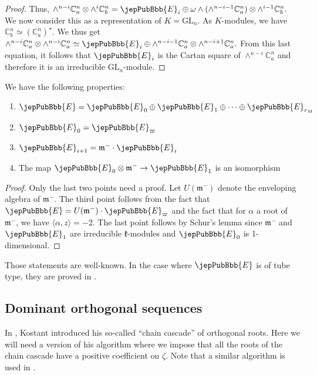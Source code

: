 \begin{proof}
Thus, $\wedge^{n-i}\mathbb C_a^n\otimes\wedge^i\mathbb C_b^n=\jepPubBbb{E}_i\oplus\omega\wedge(\wedge^{n-i-1}\mathbb C_a^n)\otimes\wedge^{i-1}\mathbb C_b^n.$ We now consider this as a representation of $K=\mathrm{GL}_n$. As $K$-modules, we have $\mathbb C_b^n\simeq(\mathbb C_a^n)^\star$. We thus get $\wedge^{n-i}\mathbb C_a^n\otimes\wedge^{n-i}\mathbb C_a^n\simeq\jepPubBbb{E}_i\oplus\wedge^{n-i-1}\mathbb C_a^n\otimes\wedge^{n-i+1}\mathbb C_a^n.$ From this last equation, it follows that $\jepPubBbb{E}_i$ is the Cartan square of $\wedge^{n-i}\mathbb C_a^n$ and therefore it is an irreducible $\mathrm{GL}_n$-module.
\end{proof}
\begin{proposition}
We have the following properties:
\begin{enumerate}[label=(\alph*)]
\item $\jepPubBbb{E}=\jepPubBbb{E}_0\oplus\jepPubBbb{E}_1\oplus\cdots\oplus\jepPubBbb{E}_{r_M}$
\item $\jepPubBbb{E}_0=\jepPubBbb{E}_\varpi$
\item $\jepPubBbb{E}_{i+1}=\mathfrak m^-\cdot\jepPubBbb{E}_i$
\item The map $\jepPubBbb{E}_0\otimes\mathfrak m^-\to\jepPubBbb{E}_1$ is an isomorphism
\end{enumerate}
\end{proposition}
\begin{proof}
Only the last two points need a proof. Let $U(\mathfrak m^-)$ denote the enveloping algebra of $\mathfrak m^-$. The third point follows from the fact that $\jepPubBbb{E}=U(\mathfrak m^-)\cdot\jepPubBbb{E}_\varpi$ and the fact that for $\alpha$ a root of $\mathfrak m^-$, we have $\langle\alpha,z\rangle=-2$. The last point follows by Schur’s lemma since $\mathfrak m^-$ and $\jepPubBbb{E}_1$ are irreducible $\mathfrak k$-modules and $\jepPubBbb{E}_0$ is 1-dimensional.
\end{proof}
\begin{remark}
Those statements are well-known. In the case where $\jepPubBbb{E}$ is of tube type, they are proved in \cite[Prop.~5.2]{jep93Gro94}.
\end{remark}

\subsection{Dominant orthogonal sequences}
In \cite{jep93Kos12}, Kostant introduced his so-called ``chain cascade'' of orthogonal roots. Here we will need a version of his algorithm where we impose that all the roots of the chain cascade have a positive coefficient on $\zeta$. Note that a similar algorithm is used in \cite{jep93BM15}.

